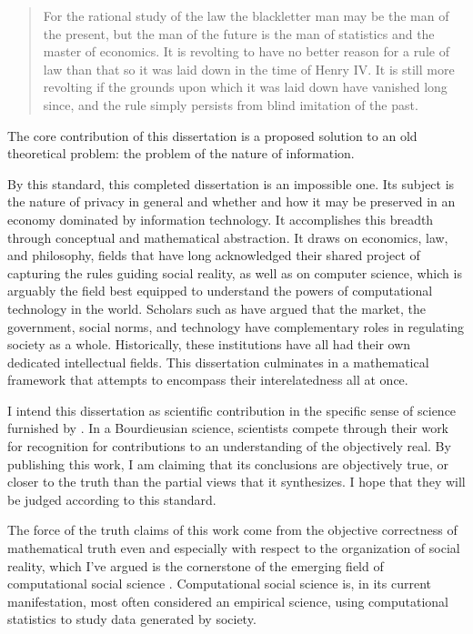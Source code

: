 \documentclass[../thesis.tex]{subfiles}
\begin{document}
 \begin{quote}
 For the rational study of the law the blackletter man may be the man of the present, but the man of the future is the man of statistics and the master of economics. It is revolting to have no better reason for a rule of law than that so it was laid down in the time of Henry IV. It is still more revolting if the grounds upon which it was laid down have vanished long since, and the rule simply persists from blind imitation of the past. \cite{holmes1897path}
 \end{quote}
 
 The core contribution of this dissertation is a proposed
 solution to an old theoretical problem: the problem of the
 nature of information.
 
 
 
 By this standard, this completed dissertation is an impossible
 one.
 Its subject is the nature of privacy in general and whether and how it may be preserved in an economy dominated by information technology.
 It accomplishes this breadth through conceptual and mathematical
 abstraction.
 It draws on economics, law, and philosophy, fields that have long acknowledged their shared project of capturing the rules guiding social reality, as well as on computer science, which is arguably the field best equipped to understand the powers of computational technology in the world.
 Scholars such as \citet{lessig1999code} have argued that the market, the government, social norms, and technology have complementary roles in regulating society as a whole.
 Historically, these institutions have all had their own dedicated intellectual fields.
 This dissertation culminates in a mathematical framework that attempts to encompass their interelatedness all at once.

 I intend this dissertation as scientific contribution
 in the specific sense of science furnished by
 \citet{bourdieu2004science}.
 In a Bourdieusian science, scientists compete through their work
 for recognition for contributions to an understanding of the
 objectively real.
 By publishing this work, I am claiming that its conclusions
 are objectively true, or closer to the truth than the partial
 views that it synthesizes.
 I hope that they will be judged according to this standard.

 The force of the truth claims of this work come from the
 objective correctness of mathematical truth even and especially
 with respect to the organization of social reality, which I've
 argued is the cornerstone of the emerging field of
 computational social science \citep{benthall2016philosophy}.
 Computational social science is, in its current manifestation,
 most often considered an empirical science, using computational
 statistics to study data generated by society.
\end{document}
